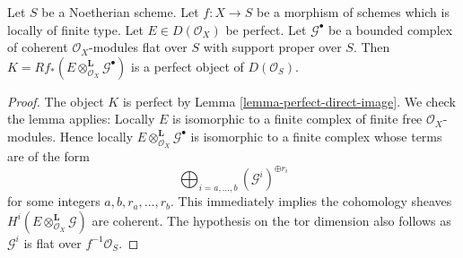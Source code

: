 \begin{lemma}
\label{lemma-tensor-perfect}
Let $S$ be a Noetherian scheme. Let $f : X \to S$ be a morphism of schemes
which is locally of finite type. Let $E \in D(\mathcal{O}_X)$ be perfect.
Let $\mathcal{G}^\bullet$ be a bounded complex of coherent
$\mathcal{O}_X$-modules flat over $S$ with support proper over $S$.
Then $K = Rf_*(E \otimes_{\mathcal{O}_X}^\mathbf{L} \mathcal{G}^\bullet)$
is a perfect object of $D(\mathcal{O}_S)$.
\end{lemma}

\begin{proof}
The object $K$ is perfect by Lemma \ref{lemma-perfect-direct-image}.
We check the lemma applies: Locally $E$ is isomorphic to a finite complex
of finite free $\mathcal{O}_X$-modules. Hence locally
$E \otimes^\mathbf{L}_{\mathcal{O}_X} \mathcal{G}^\bullet$ is isomorphic
to a finite complex whose terms are of the form
$$
\bigoplus\nolimits_{i = a, \ldots, b} (\mathcal{G}^i)^{\oplus r_i}
$$
for some integers $a, b, r_a, \ldots, r_b$. This immediately implies the
cohomology sheaves $H^i(E \otimes^\mathbf{L}_{\mathcal{O}_X} \mathcal{G})$
are coherent. The hypothesis on the tor dimension also follows as
$\mathcal{G}^i$ is flat over $f^{-1}\mathcal{O}_S$.
\end{proof}
